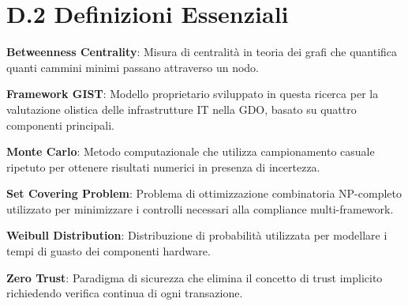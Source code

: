 \section{\texorpdfstring{\textbf{D.2 Definizioni Essenziali}}{D.2 - Definizioni Essenziali}}

\textbf{Betweenness Centrality}: Misura di centralità in teoria dei grafi che quantifica quanti cammini minimi passano attraverso un nodo.

\textbf{Framework GIST}: Modello proprietario sviluppato in questa ricerca per la valutazione olistica delle infrastrutture IT nella GDO, basato su quattro componenti principali.

\textbf{Monte Carlo}: Metodo computazionale che utilizza campionamento casuale ripetuto per ottenere risultati numerici in presenza di incertezza.

\textbf{Set Covering Problem}: Problema di ottimizzazione combinatoria NP-completo utilizzato per minimizzare i controlli necessari alla compliance multi-framework.

\textbf{Weibull Distribution}: Distribuzione di probabilità utilizzata per modellare i tempi di guasto dei componenti hardware.

\textbf{Zero Trust}: Paradigma di sicurezza che elimina il concetto di trust implicito richiedendo verifica continua di ogni transazione.

